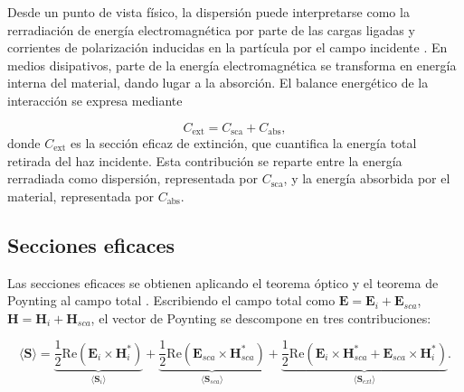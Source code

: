 Desde un punto de vista físico, la dispersión puede interpretarse como la
rerradiación de energía electromagnética por parte de las cargas ligadas y
corrientes de polarización inducidas en la partícula por el campo incidente
\cite[cap.~3]{Bohren1983}. En medios disipativos,
parte de la energía electromagnética se transforma en energía interna del
material, dando lugar a la absorción. El balance energético de la interacción
se expresa mediante

\begin{equation}
  C_{\text{ext}} = C_{\text{sca}} + C_{\text{abs}},
\end{equation}
donde $C_{\text{ext}}$ es la sección eficaz de extinción, que cuantifica 
la energía total retirada del haz incidente. Esta contribución se reparte 
entre la energía rerradiada como dispersión, representada por $C_{\text{sca}}$, 
y la energía absorbida por el material, representada por $C_{\text{abs}}$.


\subsection{Secciones eficaces}

Las secciones eficaces se obtienen aplicando el teorema óptico y el teorema de
Poynting al campo total \cite{Bohren1983}. 
Escribiendo el campo total como $\mathbf{E} = \mathbf{E}_i + \mathbf{E}_{sca}$,
$\mathbf{H} = \mathbf{H}_i + \mathbf{H}_{sca}$, el vector de Poynting se
descompone en tres contribuciones:

\begin{equation}
  \langle\mathbf{S}\rangle
  = \underbrace{\frac{1}{2}\mathrm{Re}(\mathbf{E}_i\times\mathbf{H}_i^*)}_{\langle\mathbf{S}_i\rangle}
  + \underbrace{\frac{1}{2}\mathrm{Re}(\mathbf{E}_{sca}\times\mathbf{H}_{sca}^*)}_{\langle\mathbf{S}_{sca}\rangle}
  + \underbrace{\frac{1}{2}\mathrm{Re}(\mathbf{E}_i\times\mathbf{H}_{sca}^*
    + \mathbf{E}_{sca}\times\mathbf{H}_i^*)}_{\langle\mathbf{S}_{ext}\rangle}.
\end{equation}

